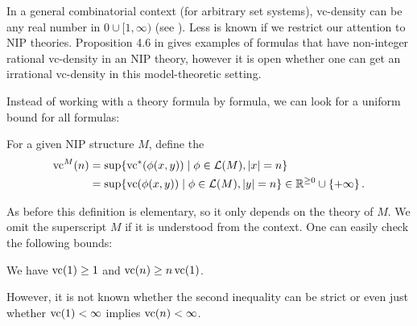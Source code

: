 In a general combinatorial context (for arbitrary set systems),
vc-density can be any real number in $0 \cup [1, \infty)$ (see \cite{ash8}).
Less is known if we restrict our attention to NIP theories.
Proposition 4.6 in \cite{density} gives examples of formulas that have non-integer rational vc-density in an NIP theory,
however it is open whether one can get an irrational vc-density in this model-theoretic setting.

Instead of working with a theory formula by formula, we can look for a uniform bound for all formulas:
\begin{Definition} \label{vc_fn_def}
  For a given NIP structure $M$, define the 
  \begin{align*}
    \operatorname{vc}^M(n) &= \sup \{\operatorname{vc}^*(\phi(x, y)) \mid \phi \in \mathcal L(M), |x| = n\} \\
             &= \sup \{\operatorname{vc}(\phi(x, y)) \mid \phi \in \mathcal L(M), |y| = n\} \in \mathbb{R}^{\geq 0} \cup \left\{+\infty\right\}.
  \end{align*}
\end{Definition}

As before this definition is elementary, so it only depends on the theory of $M$.
We omit the superscript $M$ if it is understood from the context.
One can easily check the following bounds:
\begin{Lemma}  We have $\operatorname{vc}(1) \geq 1$ and $\operatorname{vc}(n) \geq n\operatorname{vc}(1)$.
  
\end{Lemma}

However, it is not known whether the second inequality can be strict or even just whether $\operatorname{vc}(1) < \infty$ implies $\operatorname{vc}(n) < \infty$.
